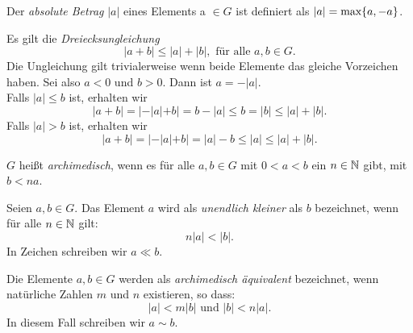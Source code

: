 \begin{defn} \label{betrag}
Der \textit{absolute Betrag} $|a|$ eines Elements a $\in  G$ ist definiert als $|a| = \textup{max}\lbrace a, -a \rbrace$.
\end{defn}

Es gilt die \textit{Dreiecksungleichung}
\[|a+ b | \le |a| + |b|, \text{ für alle } a, b \in G.\]
Die Ungleichung gilt trivialerweise wenn beide Elemente das gleiche Vorzeichen haben. Sei also $a < 0$ und $b > 0$. Dann ist $a= -|a|$.\\
Falls $|a|\le b$ ist, erhalten wir
\[ |a + b |= |-|a|+b| = b - |a| \le b = |b|\le|a| + |b|. \]
Falls $|a| >b$ ist, erhalten wir 
\[|a+b| = |-|a| +b| = |a| - b \le |a|\le |a| + |b|.\]  
%
% 
%
%
%
%
%
\begin{defn}\label{archim}
$G$ heißt \textit{archimedisch}, wenn es für alle $a, b \in G$  mit $0 < a < b$ ein $n \in \mathbb{N} $ gibt, mit $b < na$.
\end{defn}
%
%
\begin{defn}\label{uek}
Seien $a, b \in G$. Das Element $a$ wird als \textit{unendlich kleiner} als $b$ bezeichnet, wenn für alle $  n \in \mathbb{N} $ gilt: 
\[n|a| < |b|.\]
In Zeichen schreiben wir $a \ll b$.
\end{defn}
%
\begin{defn}\label{aae}
Die Elemente $a,b \in G$ werden als \textit{archimedisch äquivalent} bezeichnet, wenn natürliche Zahlen $m$ und $n$ existieren, so dass: 
\[|a| < m|b| \text{ und } |b| < n|a|.\]
In diesem Fall schreiben wir $ a \sim b $. 
\end{defn}
%
